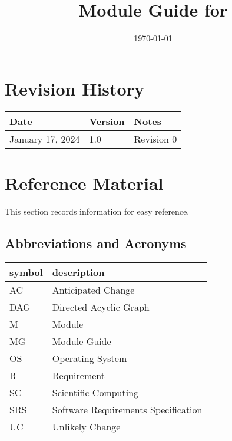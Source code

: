 \documentclass[12pt, titlepage]{article}
\begin{document}
\title{Module Guide for \progname{}} 
\author{\authname}
\date{\today}

\maketitle


\section{Revision History}

\begin{tabularx}{\textwidth}{p{3cm}p{2cm}X}
\toprule {\bf Date} & {\bf Version} & {\bf Notes}\\
\midrule
January 17, 2024 & 1.0 & Revision 0\\
\bottomrule
\end{tabularx}

\newpage

\section{Reference Material}

This section records information for easy reference.

\subsection{Abbreviations and Acronyms}

\renewcommand{\arraystretch}{1.2}
\begin{tabular}{l l} 
  \toprule		
  \textbf{symbol} & \textbf{description}\\
  \midrule 
  AC & Anticipated Change\\
  DAG & Directed Acyclic Graph \\
  M & Module \\
  MG & Module Guide \\
  OS & Operating System \\
  R & Requirement\\
  SC & Scientific Computing \\
  SRS & Software Requirements Specification\\
  UC & Unlikely Change \\
  \bottomrule
\end{tabular}\\

\newpage
\end{document}
